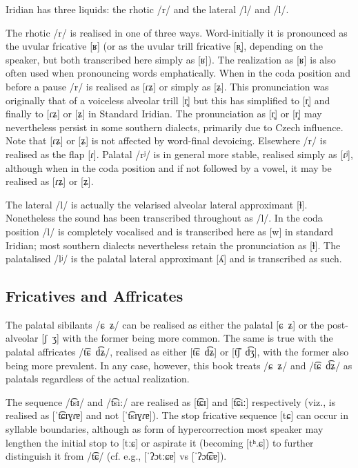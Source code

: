 Iridian has three liquids: the rhotic /r/ and the lateral /l/ and /l/.

The rhotic /r/ is realised in one of three ways. Word-initially it is pronounced
as the uvular fricative [ʁ] (or as the uvular trill fricative [ʀ̝], depending on
the speaker, but both transcribed here simply as [ʁ]). The realization as [ʁ] is
also often used when pronouncing words emphatically. When in the coda position
and before a pause /r/ is realised as [ɾʑ] or simply as [ʑ]. This pronunciation
was originally that of a voiceless alveolar trill [r̥] but this has simplified
to [r̝] and finally to [ɾʑ] or [ʑ] in Standard Iridian. The  pronunciation as
[r̥] or [r̝] may nevertheless persist in some southern dialects, primarily due
to Czech influence. Note that [ɾʑ] or [ʑ] is not affected by
word-final devoicing. Elsewhere /r/ is realised as the flap [ɾ]. Palatal /rʲ/ is
in general more stable, realised simply as [ɾʲ], although when in the coda
position and if not followed by a vowel, it may be realised as [ɾʑ] or [ʑ].

The lateral /l/ is actually the velarised alveolar lateral approximant [ɫ].
Nonetheless the sound has been transcribed throughout as /l/. In the coda
position /l/ is completely vocalised and is transcribed here as [w] in standard
Iridian; most southern dialects nevertheless retain the pronunciation as [ɫ].
The palatalised /lʲ/ is the palatal lateral approximant [ʎ] and is transcribed
as such.

\subsection{Fricatives and Affricates}

The palatal sibilants /ɕ~ʑ/ can be realised as either the palatal [ɕ~ʑ] or the
post-alveolar [ʃ~ʒ] with the former being more common. The same is true with the
palatal affricates /t͡ɕ~d͡ʑ/, realised as either [t͡ɕ~d͡ʑ] or [t͡ʃ~d͡ʒ], with
the former also being more prevalent. In any case, however, this book treats
/ɕ~ʑ/ and /t͡ɕ~d͡ʑ/ as palatals regardless of the actual realization.

The sequence /t͡sɪ/ and /t͡si:/ are realised as [t͡ɕɪ] and [t͡ɕiː] respectively
(viz.,  is realised as [ˈt͡ɕɪɣɾɐ] and not [ˈt͡sɪɣɾɐ]). The
stop fricative sequence [tɕ] can occur in syllable boundaries, although as form
of hypercorrection most speaker may lengthen the initial stop to [tːɕ] or
aspirate it (becoming [tʰ.ɕ]) to further distinguish it from /t͡ɕ/ (cf. e.g.,
 [ˈʔɔtːɕɐ] vs  [ˈʔɔt͡ɕɐ]).

